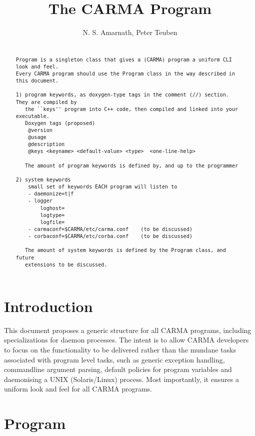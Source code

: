 \documentclass[preprint]{aastex} %
\begin{document}
\title{The CARMA Program}

\author{N. S. Amarnath, Peter Teuben}

\begin{abstract}

\begin{verbatim}

Program is a singleton class that gives a (CARMA) program a uniform CLI look and feel.
Every CARMA program should use the Program class in the way described in this document.

1) program keywords, as doxygen-type tags in the comment (//) section. They are compiled by
   the ``keys'' program into C++ code, then compiled and linked into your executable.
   Doxygen tags (proposed)
    @version
    @usage
    @description
    @keys <keyname>	<default-value>	<type>	<one-line-help>

   The amount of program keywords is defined by, and up to the programmer

2) system keywords
    small set of keywords EACH program will listen to
	- daemonize=t|f
	- logger
		loghost=
		logtype=
		logfile=
	- carmaconf=$CARMA/etc/carma.conf    (to be discussed)
	- corbaconf=$CARMA/etc/corba.conf    (to be discussed)

   The amount of system keywords is defined by the Program class, and future 
   extensions to be discussed.

\end{verbatim}

\end{abstract}

\section{Introduction}

This document proposes a generic structure for all CARMA programs,
including specializations for daemon processes. The intent is to
allow CARMA developers to focus on the functionality to be delivered
rather than the mundane tasks associated with program level tasks,
such as generic exception handling, commandline argument parsing,
default policies for program variables and daemonising a UNIX
(Solaris/Linux) process. Most importantly, it ensures a uniform
look and feel for all CARMA programs.

\section{Program}
\end{document}
